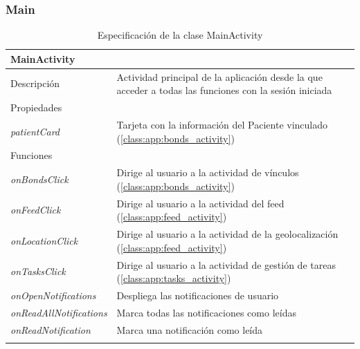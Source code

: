 \subsubsection{Main}

\vspace{-5pt}
\begin{longtable}{|p{} p{}|}
    \hline
    \multicolumn{2}{|l|}{MainActivity} \\ \hline \hline
    Descripción      & Actividad principal de la aplicación desde la que acceder a todas las funciones con la sesión iniciada \\ \hline
    \multicolumn{2}{|l|}{Propiedades} \\
    \emph{patientCard}  & Tarjeta con la información del Paciente vinculado (\ref{class:app:bonds_activity})  \\ \hline
    \multicolumn{2}{|l|}{Funciones} \\
    \emph{onBondsClick}  & Dirige al usuario a la actividad de vínculos (\ref{class:app:bonds_activity})  \\
    \emph{onFeedClick}  & Dirige al usuario a la actividad del feed (\ref{class:app:feed_activity})  \\ 
    \emph{onLocationClick}  & Dirige al usuario a la actividad de la geolocalización (\ref{class:app:feed_activity})  \\ 
    \emph{onTasksClick}  & Dirige al usuario a la actividad de gestión de tareas (\ref{class:app:tasks_activity})  \\ 
    \emph{onOpenNotifications}  & Despliega las notificaciones de usuario \\ 
    \emph{onReadAllNotifications}  & Marca todas las notificaciones como leídas \\ 
    \emph{onReadNotification}  & Marca una notificación como leída \\ \hline
    \caption{Especificación de la clase MainActivity}
    \label{class:app:main_activity}
\end{longtable}

